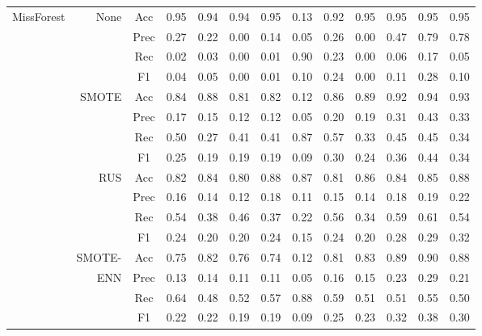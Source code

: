 \begin{table*}
\begin{narrow}{-1cm}{-1cm}
\begin{subtable}[t]{2.05\columnwidth}
\begin{tabular}{l|r|c|cccccccccc}
        MissForest & None & Acc & 0.95 & 0.94 & 0.94 & 0.95 & 0.13 & 0.92 & 0.95 & 0.95 & 0.95 & 0.95 \\
        ~ & ~ & Prec & 0.27 & 0.22 & 0.00 & 0.14 & 0.05 & 0.26 & 0.00 & 0.47 & 0.79 & 0.78 \\
        ~ & ~ & Rec & 0.02 & 0.03 & 0.00 & 0.01 & 0.90 & 0.23 & 0.00 & 0.06 & 0.17 & 0.05 \\
        ~ & ~ & F1 & 0.04 & 0.05 & 0.00 & 0.01 & 0.10 & 0.24 & 0.00 & 0.11 & 0.28 & 0.10 \\
        \cline{2-13}
        ~ & SMOTE & Acc & 0.84 & 0.88 & 0.81 & 0.82 & 0.12 & 0.86 & 0.89 & 0.92 & 0.94 & 0.93 \\
        ~ & ~ & Prec & 0.17 & 0.15 & 0.12 & 0.12 & 0.05 & 0.20 & 0.19 & 0.31 & 0.43 & 0.33 \\
        ~ & ~ & Rec & 0.50 & 0.27 & 0.41 & 0.41 & 0.87 & 0.57 & 0.33 & 0.45 & 0.45 & 0.34 \\
        ~ & ~ & F1 & 0.25 & 0.19 & 0.19 & 0.19 & 0.09 & 0.30 & 0.24 & 0.36 & 0.44 & 0.34 \\
        \cline{2-13}
        ~ & RUS & Acc & 0.82 & 0.84 & 0.80 & 0.88 & 0.87 & 0.81 & 0.86 & 0.84 & 0.85 & 0.88 \\
        ~ & ~ & Prec & 0.16 & 0.14 & 0.12 & 0.18 & 0.11 & 0.15 & 0.14 & 0.18 & 0.19 & 0.22 \\
        ~ & ~ & Rec & 0.54 & 0.38 & 0.46 & 0.37 & 0.22 & 0.56 & 0.34 & 0.59 & 0.61 & 0.54 \\
        ~ & ~ & F1 & 0.24 & 0.20 & 0.20 & 0.24 & 0.15 & 0.24 & 0.20 & 0.28 & 0.29 & 0.32 \\
        \cline{2-13}
        ~ & SMOTE- & Acc & 0.75 & 0.82 & 0.76 & 0.74 & 0.12 & 0.81 & 0.83 & 0.89 & 0.90 & 0.88 \\
        ~ & ENN & Prec & 0.13 & 0.14 & 0.11 & 0.11 & 0.05 & 0.16 & 0.15 & 0.23 & 0.29 & 0.21 \\
        ~ & ~ & Rec & 0.64 & 0.48 & 0.52 & 0.57 & 0.88 & 0.59 & 0.51 & 0.51 & 0.55 & 0.50 \\
        ~ & ~ & F1 & 0.22 & 0.22 & 0.19 & 0.19 & 0.09 & 0.25 & 0.23 & 0.32 & 0.38 & 0.30 \\
        \hline\hline


\end{tabular}
\end{subtable}
\end{narrow}
\end{table*}
